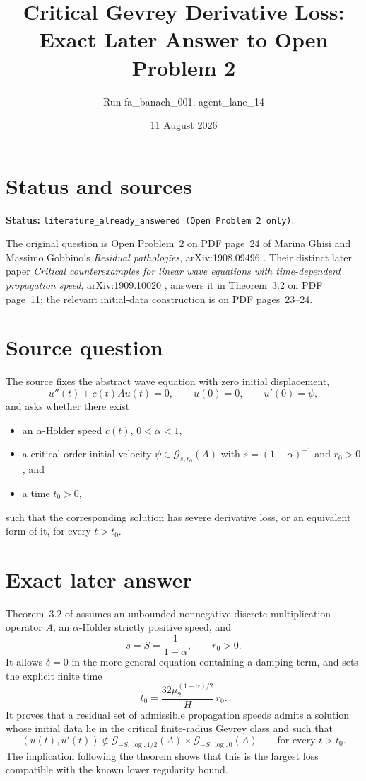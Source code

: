 \documentclass[11pt]{article}
\title{Critical Gevrey Derivative Loss:\\Exact Later Answer to Open Problem 2}
\author{Run fa\_banach\_001, agent\_lane\_14}
\date{11 August 2026}
\begin{document}
\maketitle

\section*{Status and sources}

\textbf{Status:} \texttt{literature\_already\_answered (Open Problem 2 only)}.

The original question is Open Problem~2 on PDF page~24 of Marina Ghisi and
Massimo Gobbino's \emph{Residual pathologies}, arXiv:1908.09496
\cite{Residual}.  Their distinct later paper \emph{Critical counterexamples
for linear wave equations with time-dependent propagation speed},
arXiv:1909.10020 \cite{Critical}, answers it in Theorem~3.2 on PDF page~11;
the relevant initial-data construction is on PDF pages~23--24.

\section*{Source question}

The source fixes the abstract wave equation with zero initial displacement,
\[
 u''(t)+c(t)Au(t)=0,
 \qquad u(0)=0,
 \qquad u'(0)=\psi,
\]
and asks whether there exist
\begin{itemize}
\item an $\alpha$-H\"older speed $c(t)$, $0<\alpha<1$,
\item a critical-order initial velocity
  $\psi\in\mathcal G_{s,r_0}(A)$ with
  $s=(1-\alpha)^{-1}$ and $r_0>0$, and
\item a time $t_0>0$,
\end{itemize}
such that the corresponding solution has severe derivative loss, or an
equivalent form of it, for every $t>t_0$.

\section*{Exact later answer}

Theorem~3.2 of \cite{Critical} assumes an unbounded nonnegative discrete
multiplication operator $A$, an $\alpha$-H\"older strictly positive speed,
and
\[
 s=S=\frac1{1-\alpha},\qquad r_0>0.
\]
It allows $\delta=0$ in the more general equation containing a damping term,
and sets the explicit finite time
\[
 t_0=\frac{32\mu_2^{(1+\alpha)/2}}{H}\,r_0.
\]
It proves that a residual set of admissible propagation speeds admits a
solution whose initial data lie in the critical finite-radius Gevrey class
and such that
\[
 (u(t),u'(t))\notin
 \mathcal G_{-S,\log,1/2}(A)\times
 \mathcal G_{-S,\log,0}(A)
 \qquad\text{for every }t>t_0.
\]
The implication following the theorem shows that this is the largest loss
compatible with the known lower regularity bound.
\end{document}
